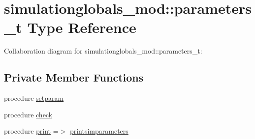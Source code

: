 \hypertarget{structsimulationglobals__mod_1_1parameters__t}{}\section{simulationglobals\+\_\+mod\+:\+:parameters\+\_\+t Type Reference}
\label{structsimulationglobals__mod_1_1parameters__t}


Collaboration diagram for simulationglobals\+\_\+mod\+:\+:parameters\+\_\+t\+:
\subsection*{Private Member Functions}
\begin{DoxyCompactItemize}
\item 
procedure \mbox{\hyperlink{structsimulationglobals__mod_1_1parameters__t_a247d15eba9f019e79c02b2be9a22ad86}{setparam}}
\item 
procedure \mbox{\hyperlink{structsimulationglobals__mod_1_1parameters__t_a7e20edb4525a73f679bd1175c9b9b399}{check}}
\item 
procedure \mbox{\hyperlink{structsimulationglobals__mod_1_1parameters__t_a3ffbed4e006d02030a0f863b5194d183}{print}} =$>$ \mbox{\hyperlink{namespacesimulationglobals__mod_ab67964fe7c3fb20a4ce0b4193520aa1d}{printsimparameters}}
\end{DoxyCompactItemize}
